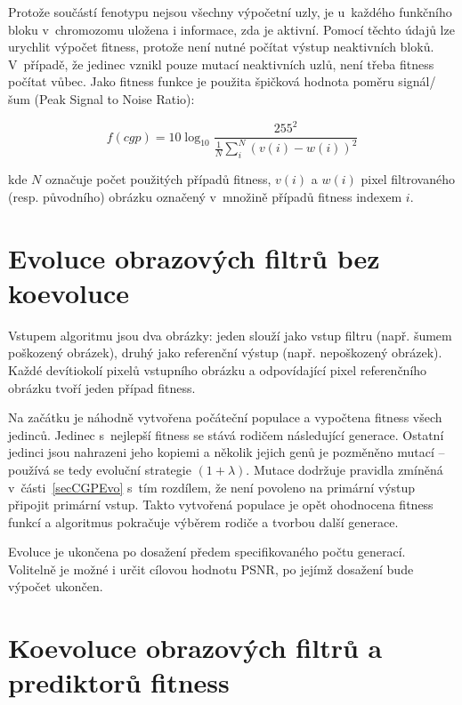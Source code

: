Protože součástí fenotypu nejsou všechny výpočetní uzly, je u~každého funkčního bloku v~chromozomu uložena i informace, zda je aktivní. Pomocí těchto údajů lze urychlit výpočet fitness, protože není nutné počítat výstup neaktivních bloků. V~případě, že jedinec vznikl pouze mutací neaktivních uzlů, není třeba fitness počítat vůbec. Jako fitness funkce je použita špičková hodnota poměru signál/šum (Peak Signal to Noise Ratio):

\begin{equation}
    \label{eqDesignFilterFitness}
    \mathit{f\left(cgp\right)} = 10 \log_{10} \frac{255^2}{\frac{1}{N} \sum\limits_i^N \left( v\left( i \right) - w\left( i \right)  \right)^2 }
\end{equation}

\noindent{}kde $N$ označuje počet použitých případů fitness, $v(i)$ a $w(i)$ pixel filtrovaného (resp. původního) obrázku označený v~množině případů fitness indexem $i$.

\section{Evoluce obrazových filtrů bez koevoluce}
\label{secDesignEvoSimple}

Vstupem algoritmu jsou dva obrázky: jeden slouží jako vstup filtru (např. šumem poškozený obrázek), druhý jako referenční výstup (např. nepoškozený obrázek). Každé devítiokolí pixelů vstupního obrázku a odpovídající pixel referenčního obrázku tvoří jeden případ fitness.

Na začátku je náhodně vytvořena počáteční populace a vypočtena fitness všech jedinců. Jedinec s~nejlepší fitness se stává rodičem následující generace. Ostatní jedinci jsou nahrazeni jeho kopiemi a několik jejich genů je pozměněno mutací -- používá se tedy evoluční strategie $(1 + \lambda)$. Mutace dodržuje pravidla zmíněná v~části~\ref{secCGPEvo} s~tím rozdílem, že není povoleno na primární výstup připojit primární vstup. Takto vytvořená populace je opět ohodnocena fitness funkcí a algoritmus pokračuje výběrem rodiče a tvorbou další generace.

Evoluce je ukončena po dosažení předem specifikovaného počtu generací. Volitelně je možné i určit cílovou hodnotu PSNR, po jejímž dosažení bude výpočet ukončen.



\section{Koevoluce obrazových filtrů a prediktorů fitness}
\label{secDesignCoev}

